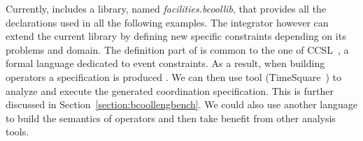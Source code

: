 





Currently, \bcool includes a library, named \emph{facilities.bcoollib}, that provides all the declarations used in all the following examples. The integrator however can extend the current library by defining new specific constraints depending on its problems and domain. The definition part of \bcool is common to the one of CCSL~\cite{tr:ccsl}, a formal language dedicated to event constraints. As a result, when building \bcool operators a \ccsl specification is produced \cite{varalarsen:gemoc13}. 
We can then use \ccsl tool (TimeSquare~\cite{timesquare}) to analyze and execute the generated coordination specification. This is further discussed in Section~\ref{section:bcoollengbench}.
We could also use another language to build the semantics of operators and then take benefit from other analysis tools.